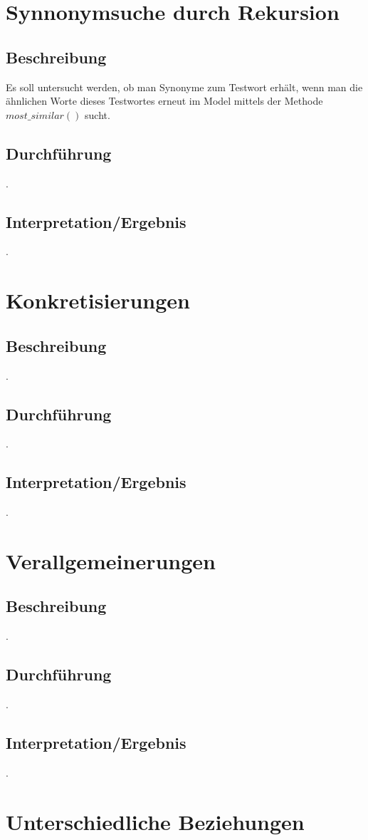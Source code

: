 \documentclass[12pt,a4paper]{report}
\begin{document}
	\section{Synnonymsuche durch Rekursion}
		\subsection{Beschreibung}
		Es soll untersucht werden, ob man Synonyme zum Testwort erhält, wenn man die ähnlichen Worte dieses Testwortes erneut im Model mittels der Methode $most\_similar()$ sucht. 
		\subsection{Durchführung}
		.
		\subsection{Interpretation/Ergebnis}
		.
	\newpage
	\section{Konkretisierungen}
		\subsection{Beschreibung}
		.
		\subsection{Durchführung}
		.
		\subsection{Interpretation/Ergebnis}
		.
	\newpage
	\section{Verallgemeinerungen}
		\subsection{Beschreibung}
		.
		\subsection{Durchführung}
		.
		\subsection{Interpretation/Ergebnis}
		.
	\newpage
	\section{Unterschiedliche Beziehungen}
\end{document}
